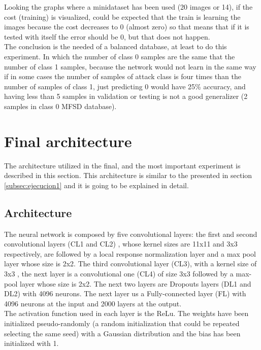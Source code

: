 Looking the graphs where a minidataset has been used (20 images or 14), if the cost (training) is visualized, could be expected that the train is learning the images because the cost decreases to 0 (almost zero) so that means that if it is tested with itself the error should be 0, but that does not happen.\\

The conclusion is the needed of a balanced database, at least to do this experiment. In which the number of class 0 samples are the same that the number of class 1 samples, because the network would not learn in the same way if in some cases the number of samples of  attack class is four times than the number of samples of class 1, just predicting 0 would have 25\% accuracy, and having less than 5 samples in validation or testing is not a good generalizer (2 samples in class 0 MFSD database).\\

\section{Final architecture}\label{Final_archi} %
The architecture utilized in the final, and the most important experiment is described in this section. This architecture is similar to the presented in section \ref{subsec:ejecucion1} and it is going to be explained in detail.\\

\subsection{Architecture}
The neural network is composed by five convolutional layers: the first and second convolutional layers (CL1 and CL2) , whose kernel sizes are 11x11 and 3x3 respectively, are followed by a local response normalization layer and a max pool layer whose size is 2x2. The third convolutional layer (CL3), with a kernel size of 3x3 , the next layer is a convolutional one (CL4) of size 3x3 followed by a max-pool layer whose size is 2x2. The next two layers are Dropouts layers (DL1 and DL2) with 4096 neurons. The next layer us a Fully-connected layer (FL) with 4096 neurons at the input and 2000 layers at the output.\\

The activation function used in each layer is the ReLu. The weights have been initialized pseudo-randomly (a random initialization that could be repeated selecting the same seed) with a Gaussian distribution and the bias has been initialized with 1.\\

